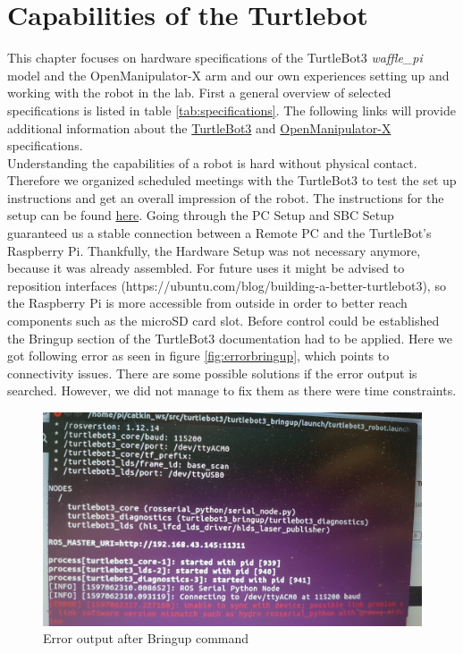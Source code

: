 \documentclass[plainarticle,zihtitle,english,final,hyperref,utf8]{zihpub}
\begin{document}
\section{Capabilities of the Turtlebot}
This chapter focuses on hardware specifications of the TurtleBot3 \textit{waffle\_pi} model and the OpenManipulator-X arm and our own experiences setting up and working with the robot in the lab. First a general overview of selected specifications is listed in table \ref{tab:specifications}. The following links will provide additional information about the \href{https://emanual.robotis.com/docs/en/platform/turtlebot3/specifications/#specifications}{TurtleBot3} and \href{https://emanual.robotis.com/docs/en/platform/openmanipulator_x/specification/#specification}{OpenManipulator-X} specifications.\\
\newline
Understanding the capabilities of a robot is hard without physical contact. Therefore we organized scheduled meetings with the TurtleBot3 to test the set up instructions and get an overall impression of the robot. The instructions for the setup can be found \href{https://emanual.robotis.com/docs/en/platform/turtlebot3/setup/#setup}{here}. Going through the PC Setup and SBC Setup guaranteed us a stable connection between a Remote PC and the TurtleBot's Raspberry Pi. Thankfully, the Hardware Setup was not necessary anymore, because it was already assembled. For future uses it might be advised to reposition interfaces (https://ubuntu.com/blog/building-a-better-turtlebot3), so the Raspberry Pi is more accessible from outside in order to better reach components such as the microSD card slot. Before control could be established the Bringup section of the TurtleBot3 documentation had to be applied. Here we got following error as seen in figure \ref{fig:errorbringup}, which points to connectivity issues. There are some possible solutions if the error output is searched. However, we did not manage to fix them as there were time constraints.\\
\begin{figure}[h!]
  \begin{center}
    \includegraphics[width=.65\textwidth]{ErrorPhysTurtle.jpeg}
    \caption{Error output after Bringup command}
    \label{fig:errorphys}
  \end{center}
\end{figure}
\end{document}
